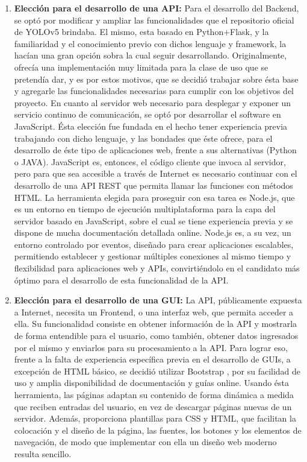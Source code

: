 \begin{enumerate}
    \item \textbf{Elección para el desarrollo de una API:} Para el desarrollo del Backend, se optó por modificar y ampliar las funcionalidades que el repositorio oficial de YOLOv5 brindaba. El mismo, esta basado en Python+Flask, y la familiaridad y el conocimiento previo con dichos lenguaje y framework, la hacían una gran opción sobra la cual seguir desarrollando. Originalmente, ofrecía una implementación muy limitada para la clase de uso que se pretendía dar, y es por estos motivos, que se decidió trabajar sobre ésta base y agregarle las funcionalidades necesarias para cumplir con los objetivos del proyecto.
    En cuanto al servidor web necesario para desplegar y exponer un servicio continuo de comunicación, se optó por desarrollar el software en JavaScript. Ésta elección fue fundada en el hecho tener experiencia previa trabajando con dicho lenguaje, y las bondades que éste ofrece, para el desarrollo de éste tipo de aplicaciones web, frente a sus alternativas (Python o JAVA). JavaScript es, entonces, el código cliente que invoca al servidor, pero para que sea accesible a través de Internet es necesario continuar con el desarrollo de una API REST que permita llamar las funciones con métodos HTML. La herramienta elegida para proseguir con esa tarea es Node.js, que es un entorno en tiempo de ejecución multiplataforma para la capa del servidor basado en JavaScript, sobre el cual se tiene experiencia previa y se dispone de mucha documentación detallada online. Node.js es, a su vez, un entorno controlado por eventos, diseñado para crear aplicaciones escalables, permitiendo establecer y gestionar múltiples conexiones al mismo tiempo y flexibilidad para aplicaciones web y APIs, convirtiéndolo en el candidato más óptimo para el desarrollo de esta funcionalidad de la API.
    
    \item \textbf{Elección para el desarrollo de una GUI:} La API, públicamente expuesta a Internet, necesita un Frontend, o una interfaz web, que permita acceder a ella. Su funcionalidad consiste en obtener información de la API y mostrarla de forma entendible para el usuario, como también, obtener datos ingresados por el mismo y enviarlos para su procesamiento a la API.
    Para lograr eso, frente a la falta de experiencia específica previa en el desarrollo de GUIs, a excepción de HTML básico, se decidió utilizar Bootstrap \cite{bootstrap}, por su facilidad de uso y amplia disponibilidad de documentación y guías online. Usando ésta herramienta, las páginas adaptan su contenido de forma dinámica a medida que reciben entradas del usuario, en vez de descargar páginas nuevas de un servidor. Además, proporciona plantillas para CSS y HTML, que facilitan la colocación y el diseño de la página, las fuentes, los botones y los elementos de navegación, de modo que implementar con ella un diseño web moderno resulta sencillo.  
    
\end{enumerate}

